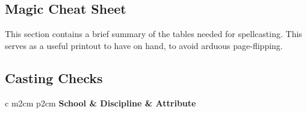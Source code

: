 \onecolumn
\begin{landscape}

\section{Magic Cheat Sheet}

This section contains a brief summary of the tables needed for spellcasting. This serves as a useful printout to have on hand, to avoid arduous page-flipping. 

\begin{multicols}{2}
\def\xS{2}
\def\wS{2}
\subsection{Casting Checks}

\begin{center}
	\begin{rndtable}{c m{\xS cm} p{\wS cm}}
	\bf School	&	\bf Discipline	&	\bf Attribute
	\\
	\\
	\\
	\\
   \\ 
	\\
	\\
	\end{rndtable}
\end{center}


\end{multicols}
\end{landscape}
